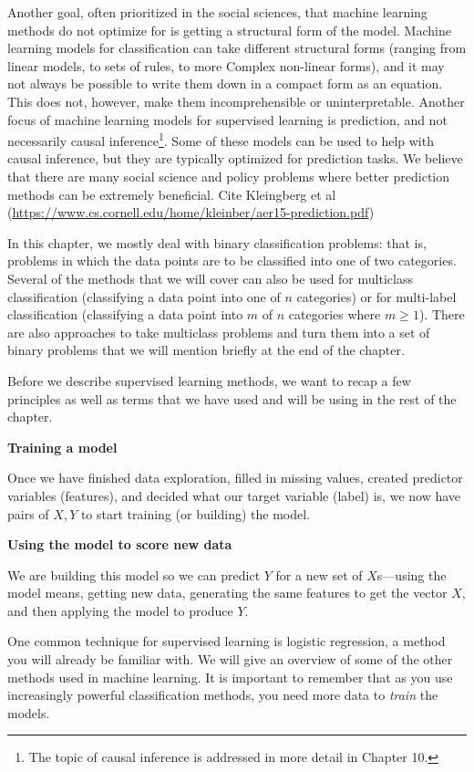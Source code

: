 \documentclass[]{krantz}
\begin{document}
Another goal, often prioritized in the social sciences, that machine
learning methods do not optimize for is getting a structural form of the
model. Machine learning models for classification can take different
structural forms (ranging from linear models, to sets of rules, to more
Complex non-linear forms), and it may not always be possible to write
them down in a compact form as an equation. This does not, however, make
them incomprehensible or uninterpretable. Another focus of machine
learning models for supervised learning is prediction, and not
necessarily causal inference\footnote{The topic of causal inference is
  addressed in more detail in Chapter 10.}. Some of these models can be
used to help with causal inference, but they are typically optimized for
prediction tasks. We believe that there are many social science and
policy problems where better prediction methods can be extremely
beneficial. Cite Kleingberg et al
(\url{https://www.cs.cornell.edu/home/kleinber/aer15-prediction.pdf})

In this chapter, we mostly deal with binary classification problems:
that is, problems in which the data points are to be classified into one
of two categories. Several of the methods that we will cover can also be
used for multiclass classification (classifying a data point into one of
\(n\) categories) or for multi-label classification (classifying a data
point into \(m\) of \(n\) categories where \(m\ge1\)). There are also
approaches to take multiclass problems and turn them into a set of
binary problems that we will mention briefly at the end of the chapter.

Before we describe supervised learning methods, we want to recap a few
principles as well as terms that we have used and will be using in the
rest of the chapter.

\textbf{Training a model}

Once we have finished data exploration, filled in missing values,
created predictor variables (features), and decided what our target
variable (label) is, we now have pairs of \(X,Y\) to start training (or
building) the model.

\textbf{Using the model to score new data}

We are building this model so we can predict \(Y\) for a new set of
\(X\)s---using the model means, getting new data, generating the same
features to get the vector \(X\), and then applying the model to produce
\(Y\).

One common technique for supervised learning is logistic regression, a
method you will already be familiar with. We will give an overview of
some of the other methods used in machine learning. It is important to
remember that as you use increasingly powerful classification methods,
you need more data to \emph{train} the models.
\end{document}
